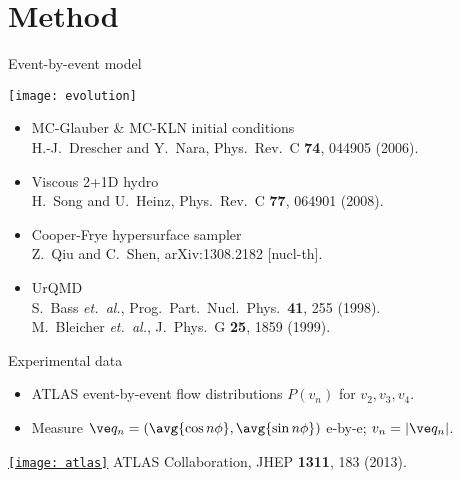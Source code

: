 \documentclass{beamer}
\begin{document}
\section{Method}


\begin{frame}{Event-by-event model}
  \begin{center}
    \texttt{[image: evolution]}
  \end{center}

  \begin{itemize}
    \item MC-Glauber \& MC-KLN initial conditions \\
      \hspace{1em} {\tiny H.-J.\ Drescher and Y.\ Nara, Phys.\ Rev.\ C {\bf 74}, 044905 (2006).}
    \item Viscous 2+1D hydro \\
      \hspace{1em} {\tiny H.\ Song and U.\ Heinz, Phys.\ Rev.\ C {\bf 77}, 064901 (2008).}
    \item Cooper-Frye hypersurface sampler \\
      \hspace{1em} {\tiny Z.\ Qiu and C.\ Shen, arXiv:1308.2182 [nucl-th].}
    \item UrQMD \\
      \hspace{1em} {\tiny S.\ Bass \emph{et.\ al.}, Prog.\ Part.\ Nucl.\ Phys.\  {\bf 41}, 255 (1998).} \\[-1ex]
      \hspace{1em} {\tiny M.\ Bleicher \emph{et.\ al.}, J.\ Phys.\ G {\bf 25}, 1859 (1999).}
  \end{itemize}

\end{frame}




\begin{frame}[label=atlas]{Experimental data}
  \begin{itemize}
    \item ATLAS event-by-event flow distributions $P(v_n)$ for $v_2,v_3,v_4$.
    \item Measure $\ve q_n = (\avg{\cos n\phi}, \avg{\sin n\phi})$ e-by-e; $v_n = |\ve q_n|$.
  \end{itemize}
  
  \vspace{3ex}

  \hyperlink{rice}{\texttt{[image: atlas]}}
  \flushright \tiny ATLAS Collaboration, JHEP {\bf 1311}, 183 (2013).
\end{frame}
\end{document}
